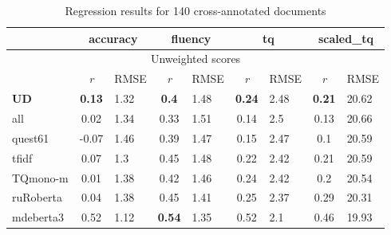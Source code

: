\begin{table}[H]
	\centering
	\begin{tabular}{l|cl|cl|cl|cl}
		\toprule
		& \multicolumn{2}{c|}{accuracy} & \multicolumn{2}{c|}{\textbf{fluency}}  & \multicolumn{2}{c|}{tq} & \multicolumn{2}{c}{scaled\_tq}    \\
		\midrule
		\multicolumn{9}{c}{Unweighted scores} \\
		\midrule
		& \textit{r}        & RMSE & \textit{r}       & RMSE & \textit{r}    & RMSE & \textit{r}    & RMSE  \\
		\midrule
		\textbf{UD}                & \textbf{0.13}  & 1.32 & \textbf{0.4}     & 1.48 & \textbf{0.24}  & 2.48 & \textbf{0.21}       & 20.62 \\
		all               & 0.02  & 1.34 & 0.33    & 1.51 & 0.14  & 2.5  & 0.13       & 20.66 \\
		quest61           & -0.07 & 1.46 & 0.39    & 1.47 & 0.15  & 2.47 & 0.1        & 20.59 \\
		\midrule
		tfidf             & 0.07  & 1.3  & 0.45    & 1.48 & 0.22  & 2.42 & 0.21       & 20.59 \\
		\midrule
		TQmono-m          & 0.01  & 1.38 & 0.42    & 1.46 & 0.24  & 2.42 & 0.2        & 20.54 \\
		ruRoberta   & 0.04  & 1.38 & 0.45    & 1.41 & 0.25  & 2.37 & 0.29       & 20.31 \\
		mdeberta3    & 0.52  & 1.12 & \textbf{0.54}    & 1.35 & 0.52  & 2.1  & 0.46       & 19.93 \\
		\bottomrule
	\end{tabular}
	\caption{\label{tab:err140_res}Regression results for 140 cross-annotated documents}
\end{table}


